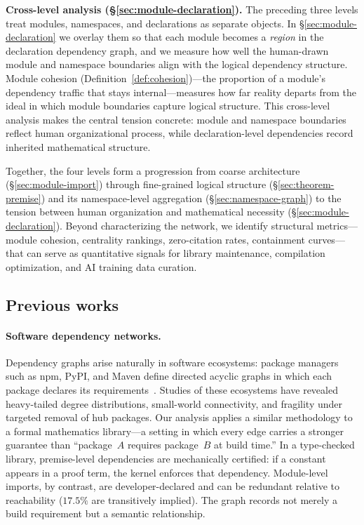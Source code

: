 \medskip
\noindent\textbf{Cross-level analysis (\S\ref{sec:module-declaration}).}
The preceding three levels treat modules, namespaces, and declarations as separate objects. In \S\ref{sec:module-declaration} we overlay them so that each module becomes a \emph{region} in the declaration dependency graph, and we measure how well the human-drawn module and namespace boundaries align with the logical dependency structure. Module cohesion (Definition~\ref{def:cohesion})---the proportion of a module's dependency traffic that stays internal---measures how far reality departs from the ideal in which module boundaries capture logical structure. This cross-level analysis makes the central tension concrete: module and namespace boundaries reflect human organizational process, while declaration-level dependencies record inherited mathematical structure.

\medskip
Together, the four levels form a progression from coarse architecture (\S\ref{sec:module-import}) through fine-grained logical structure (\S\ref{sec:theorem-premise}) and its namespace-level aggregation (\S\ref{sec:namespace-graph}) to the tension between human organization and mathematical necessity (\S\ref{sec:module-declaration}). Beyond characterizing the network, we identify structural metrics---module cohesion, centrality rankings, zero-citation rates, containment curves---that can serve as quantitative signals for library maintenance, compilation optimization, and AI training data curation.

\subsection{Previous works}
\paragraph{Software dependency networks.}
Dependency graphs arise naturally in software ecosystems: package managers such as npm, PyPI, and Maven define directed acyclic graphs in which each package declares its requirements~\cite{decan2019,labelle2004}. Studies of these ecosystems have revealed heavy-tailed degree distributions, small-world connectivity, and fragility under targeted removal of hub packages. Our analysis applies a similar methodology to a formal mathematics library---a setting in which every edge carries a stronger guarantee than ``package~$A$ requires package~$B$ at build time.'' In a type-checked library, premise-level dependencies are mechanically certified: if a constant appears in a proof term, the kernel enforces that dependency. Module-level imports, by contrast, are developer-declared and can be redundant relative to reachability ($17.5\%$ are transitively implied). The graph records not merely a build requirement but a semantic relationship.


